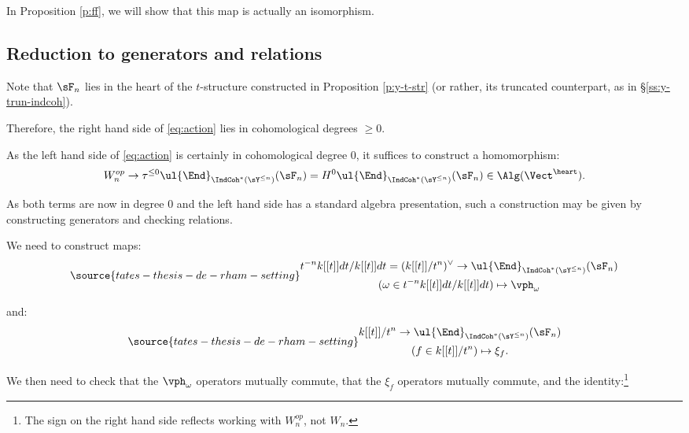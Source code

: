 \begin{rem}
\notready

In Proposition \ref{p:ff}, we will show that this map is actually an isomorphism.

\end{rem}

\subsection{Reduction to generators and relations}\label{ss:coconn-reduction}

Note that $\sF_n$ lies in the heart of the $t$-structure constructed
in Proposition \ref{p:y-t-str} (or rather, its truncated counterpart, as in
\S \ref{ss:y-trun-indcoh}).

Therefore, the right hand side of \eqref{eq:action}
lies in cohomological degrees $\geq 0$.

As the left hand side of \eqref{eq:action} is certainly in cohomological
degree $0$, it suffices to construct a homomorphism:
%
\[
W_n^{op} \to \tau^{\leq 0} \ul{\End}_{\IndCoh^*(\sY^{\leq n})}(\sF_n) =
H^0\ul{\End}_{\IndCoh^*(\sY^{\leq n})}(\sF_n) \in \Alg(\Vect^{\heart}).
\]

As both terms are now in degree $0$ and the left hand side
has a standard algebra presentation, such a construction
may be given by constructing generators and checking relations.

We need to construct maps:
%
\begin{equation}\label{eq:fns}
\source{tates-thesis-de-rham-setting}
\begin{gathered}
t^{-n}k[[t]]dt/k[[t]]dt = (k[[t]]/t^n)^{\vee} \to
\ul{\End}_{\IndCoh^*(\sY^{\leq n})}(\sF_n) \\
(\omega \in t^{-n}k[[t]]dt/k[[t]]dt) \mapsto \vph_{\omega}
\end{gathered}
\end{equation}

 and:
%
\begin{equation}\label{eq:vfs}
\source{tates-thesis-de-rham-setting}
\begin{gathered}
k[[t]]/t^n \to
\ul{\End}_{\IndCoh^*(\sY^{\leq n})}(\sF_n) \\
(f \in k[[t]]/t^n) \mapsto \xi_{f}.
\end{gathered}
\end{equation}

 We then need to check that the $\vph_{\omega}$ operators
mutually commute, that the $\xi_f$ operators mutually commute, and
the identity:\footnote{The sign on the right hand side reflects working
with $W_n^{op}$, not $W_n$.}

